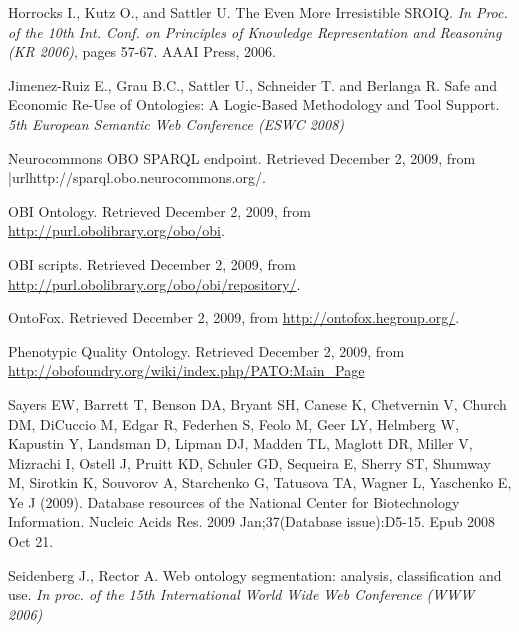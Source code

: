 \documentclass[jou]{ao2e}%
\begin{document}
\begin{thebibliography}{}
 Horrocks I., Kutz O., and Sattler U. The Even More Irresistible SROIQ. \textit{In Proc. of the 10th Int. Conf. on Principles of Knowledge Representation and Reasoning (KR 2006)}, pages 57-67. AAAI Press, 2006.

 Jimenez-Ruiz E., Grau B.C., Sattler U., Schneider T. and Berlanga R. Safe and Economic Re-Use of Ontologies: A Logic-Based Methodology and Tool Support. \textit{5th European Semantic Web Conference (ESWC 2008)} 

 Neurocommons OBO SPARQL endpoint. Retrieved December 2, 2009, from |url{http://sparql.obo.neurocommons.org/}.

 OBI Ontology. Retrieved December 2, 2009, from \url{http://purl.obolibrary.org/obo/obi}.

 OBI scripts. Retrieved December 2, 2009, from \url{http://purl.obolibrary.org/obo/obi/repository/}.

 OntoFox. Retrieved December 2, 2009, from \url{http://ontofox.hegroup.org/}.

 Phenotypic Quality Ontology. Retrieved December 2, 2009, from \url{http://obofoundry.org/wiki/index.php/PATO:Main_Page}

 Sayers EW, Barrett T, Benson DA, Bryant SH, Canese K, Chetvernin V,
   Church DM, DiCuccio M, Edgar R, Federhen S, Feolo M, Geer LY,
   Helmberg W, Kapustin Y, Landsman D, Lipman DJ, Madden TL, Maglott DR,
   Miller V, Mizrachi I, Ostell J, Pruitt KD, Schuler GD, Sequeira E,
   Sherry ST, Shumway M, Sirotkin K, Souvorov A, Starchenko G,
   Tatusova TA, Wagner L, Yaschenko E, Ye J (2009). Database resources
   of the National Center for Biotechnology Information. Nucleic Acids
   Res. 2009 Jan;37(Database issue):D5-15. Epub 2008 Oct 21.

 Seidenberg J., Rector A. Web ontology segmentation: analysis, classification and use. \textit{In proc. of the 15th International World Wide Web Conference (WWW 2006)}


\end{thebibliography}
\end{document}
